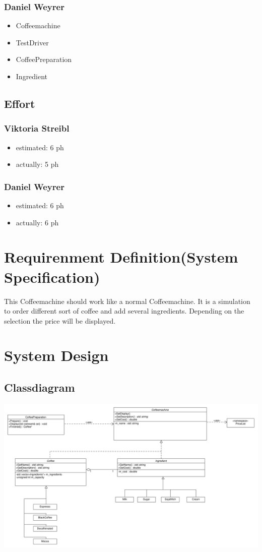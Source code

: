 \subsubsection{Daniel Weyrer}
\begin{itemize}
	\item Coffeemachine
	\item TestDriver
	\item CoffeePreparation
	\item Ingredient
\end{itemize}

\subsection{Effort}

\subsubsection {Viktoria Streibl}
\begin{itemize}
	\item estimated: 6 ph 
	\item actually: 5 ph
\end{itemize}

\subsubsection {Daniel Weyrer}
\begin{itemize}
	\item estimated: 6 ph 
	\item actually: 6 ph
\end{itemize}

\section{Requirenment Definition(System Specification)}
This Coffeemachine should work like a normal Coffeemachine. It is a simulation to order different sort of coffee and add several ingredients. Depending on the selection the price will be displayed.

\section{System Design}
\subsection{Classdiagram}
\includegraphics[scale=0.40, angle=90]{../ClassDiagram.pdf}

